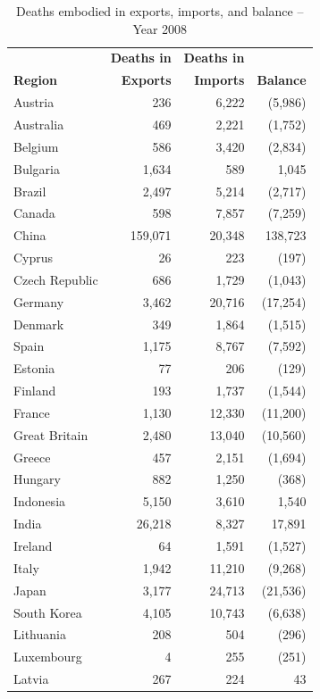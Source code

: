 \documentclass[a4paper,12pt, ]{article}
\begin{document}
\begin{table} [!hbtp] 
\caption{Deaths embodied in exports, imports, and balance -- Year 2008} 
\begin{center}
\small \begin{tabular}{lrrr}
 & \textbf{Deaths in} & \textbf{Deaths in} &  \\ 
\textbf{Region} & \textbf{Exports}& \textbf{Imports} & \textbf{Balance}\\ 
\hline
Austria &  236  &  6,222  & (5,986)\\ 
Australia &  469  &  2,221  & (1,752)\\ 
Belgium &  586  &  3,420  & (2,834)\\ 
Bulgaria &  1,634  &  589  & 1,045 \\ 
Brazil &  2,497  &  5,214  & (2,717)\\ 
Canada &  598  &  7,857  & (7,259)\\ 
China &  159,071  &  20,348  & 138,723 \\ 
Cyprus &  26  &  223  & (197)\\ 
Czech Republic &  686  &  1,729  & (1,043)\\ 
Germany &  3,462  &  20,716  & (17,254)\\ 
Denmark &  349  &  1,864  & (1,515)\\ 
Spain &  1,175  &  8,767  & (7,592)\\ 
Estonia &  77  &  206  & (129)\\ 
Finland &  193  &  1,737  & (1,544)\\ 
France &  1,130  &  12,330  & (11,200)\\ 
Great Britain &  2,480  &  13,040  & (10,560)\\ 
Greece &  457  &  2,151  & (1,694)\\ 
Hungary &  882  &  1,250  & (368)\\ 
Indonesia &  5,150  &  3,610  & 1,540 \\ 
India &  26,218  &  8,327  & 17,891 \\ 
Ireland &  64  &  1,591  & (1,527)\\ 
Italy &  1,942  &  11,210  & (9,268)\\ 
Japan &  3,177  &  24,713  & (21,536)\\ 
South Korea &  4,105  &  10,743  & (6,638)\\ 
Lithuania &  208  &  504  & (296)\\ 
Luxembourg &  4  &  255  & (251)\\ 
Latvia &  267  &  224  & 43 \\ 

\end{tabular}
\end{center}
\end{table}
\end{document}
